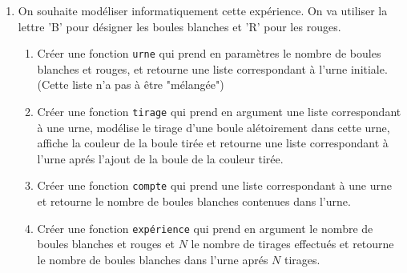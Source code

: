 \documentclass[a4paper, 11pt,reqno]{article}
\begin{document}
\begin{exercice}
\begin{enumerate}
\item On souhaite modéliser informatiquement cette expérience. On va utiliser la lettre 'B' pour désigner les boules blanches et 'R' pour les rouges. 
\begin{enumerate}
\item Créer une fonction \texttt{urne} qui prend en paramètres le nombre de boules blanches et rouges, et retourne une liste correspondant à l'urne initiale. (Cette  liste n'a pas à être "mélangée")
\item Créer une fonction \texttt{tirage} qui prend en argument une liste correspondant à une urne, modélise le tirage d'une boule alétoirement dans cette urne, affiche la couleur de la boule tirée et retourne une liste correspondant à l'urne aprés l'ajout de la boule de la couleur tirée. 
\item Créer une fonction \texttt{compte} qui prend une liste correspondant à une urne et retourne   le nombre de  boules blanches  contenues dans l'urne. 
\item Créer une fonction \texttt{expérience} qui prend en argument le nombre de boules blanches et rouges et $N$ le nombre de tirages effectués et retourne le nombre de boules blanches dans l'urne aprés $N$ tirages. 
\end{enumerate}
 
\end{enumerate}
\end{exercice}
\end{document}
